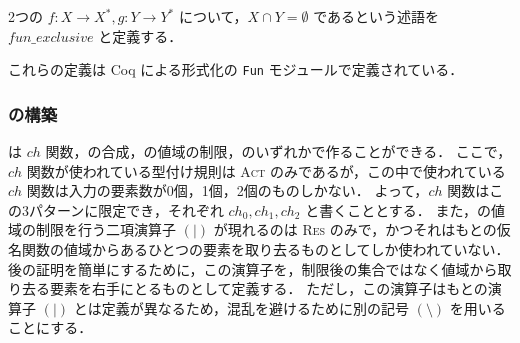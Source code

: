 \begin{dfn}
  2つの \tmp $f : X \rightarrow X^*, g : Y \rightarrow Y^*$ について，$X \cap Y = \emptyset$ であるという述語を $fun\_exclusive$ と定義する．
\end{dfn}

これらの定義は Coq による形式化の \texttt{Fun} モジュールで定義されている．



\subsubsection{\tmp の構築}

\tmp は $ch$ 関数，\tmp の合成，\tmp の値域の制限，のいずれかで作ることができる．
ここで，$ch$ 関数が使われている型付け規則は \textsc{Act} のみであるが，この中で使われている $ch$ 関数は入力の要素数が0個，1個，2個のものしかない．
よって，$ch$ 関数はこの3パターンに限定でき，それぞれ $ch_0, ch_1, ch_2$ と書くこととする．
また，\tmp の値域の制限を行う二項演算子 $(|)$ が現れるのは \textsc{Res} のみで，かつそれはもとの仮名関数の値域からあるひとつの要素を取り去るものとしてしか使われていない．
後の証明を簡単にするために，この演算子を，制限後の集合ではなく値域から取り去る要素を右手にとるものとして定義する．
ただし，この演算子はもとの演算子 $(|)$ とは定義が異なるため，混乱を避けるために別の記号 $(\setminus)$ を用いることにする．

